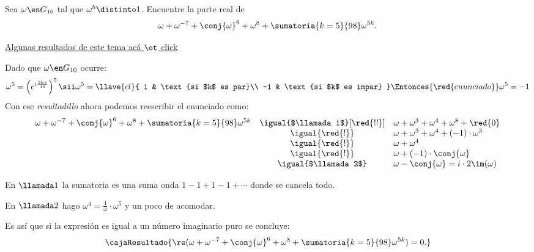 \begin{enunciado}{\ejExtra}
	Sea $\omega \en G_{10}$ tal que $\omega^5 \distinto 1$. Encuentre la parte real de
	$$
		\omega + \omega^{-7} + \conj{\omega}^6 + \omega^8 + \sumatoria{k=5}{98}\omega^{5k}.
	$$
\end{enunciado}
\hyperlink{teoria6:propiedadesGn}{Algunas resultados de este tema acá {\tiny $\ot$ click} }


Dado que $\omega \en G_{10}$ ocurre:
$$
	\omega^5 = \left(e^{i \frac{2k\pi}{10}}\right)^5
	\sii
	\omega^5 =
	\llave{cl}{
		1 & \text{si $k$ es par}\\
		-1 & \text{si $k$ es impar}
	}
	\Entonces{\red{enunciado}}
	\omega^5 = -1
$$
Con ese \textit{resultadillo} ahora podemos reescribir el enunciado como:
$$
	\begin{array}{rcl}
		\omega + \omega^{-7} + \conj{\omega}^6 + \omega^8 + \sumatoria{k = 5}{98}\omega^{5k}
		 & \igual{$\llamada1$}[\red{!!}] &
		\omega + \omega^3 + \omega^4 + \omega^8 + \red{0}                                     \\
		 & \igual{\red{!}}               & \omega + \omega^3 + \omega^4 + (-1) \cdot \omega^3 \\
		 & \igual{\red{!}}               & \omega + \omega^4                                  \\
		 & \igual{\red{!}}               & \omega + (-1) \cdot \conj{\omega}                  \\
		 & \igual{$\llamada2$}           & \omega - \conj{\omega} = i \cdot 2\im(\omega)
	\end{array}
$$

En $\llamada1$ la sumatoria es una suma onda $1 - 1 + 1 - 1 + \cdots$ donde
se cancela todo.

En $\llamada2$ hago $\omega^4 = \frac{1}{\omega} \cdot \omega^5$ y un poco de acomodar.

Es así que si la expresión es igual a un número imaginario puro se concluye:
$$
	\cajaResultado{
		\re(\omega + \omega^{-7} + \conj{\omega}^6 + \omega^8 + \sumatoria{k = 5}{98}\omega^{5k}) =  0.
	}
$$

\begin{aportes}
	\item {}
\end{aportes}
